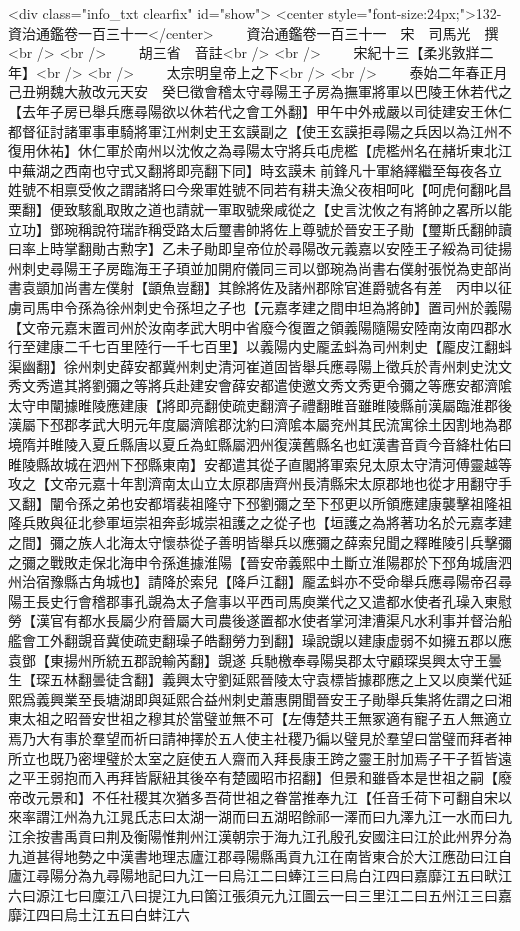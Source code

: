 <div class="info_txt clearfix" id="show">
<center style="font-size:24px;">132-資治通鑑卷一百三十一</center>
  　　資治通鑑卷一百三十一　宋　司馬光　撰<br />
<br />
　　胡三省　音註<br />
<br />
　　宋紀十三【柔兆敦牂二年】<br />
<br />
　　太宗明皇帝上之下<br />
<br />
　　泰始二年春正月己丑朔魏大赦改元天安　癸巳徵會稽太守尋陽王子房為撫軍將軍以巴陵王休若代之【去年子房已舉兵應尋陽欲以休若代之會工外翻】甲午中外戒嚴以司徒建安王休仁都督征討諸軍事車騎將軍江州刺史王玄謨副之【使王玄謨拒尋陽之兵因以為江州不復用休祐】休仁軍於南州以沈攸之為尋陽太守將兵屯虎檻【虎檻州名在赭圻東北江中蕪湖之西南也守式又翻將即亮翻下同】時玄謨未前鋒凡十軍絡繹繼至每夜各立姓號不相禀受攸之謂諸將曰今衆軍姓號不同若有耕夫漁父夜相呵叱【呵虎何翻叱昌栗翻】便致駭亂取敗之道也請就一軍取號衆咸從之【史言沈攸之有將帥之畧所以能立功】鄧琬稱說符瑞詐稱受路太后璽書帥將佐上尊號於晉安王子勛【璽斯氏翻帥讀曰率上時掌翻勛古勲字】乙未子勛即皇帝位於尋陽改元義嘉以安陸王子綏為司徒揚州刺史尋陽王子房臨海王子頊並加開府儀同三司以鄧琬為尚書右僕射張悦為吏部尚書袁顗加尚書左僕射【顗魚豈翻】其餘將佐及諸州郡除官進爵號各有差　丙申以征虜司馬申令孫為徐州刺史令孫坦之子也【元嘉孝建之間申坦為將帥】置司州於義陽【文帝元嘉末置司州於汝南孝武大明中省廢今復置之領義陽隨陽安陸南汝南四郡水行至建康二千七百里陸行一千七百里】以義陽内史龎孟蚪為司州刺史【龎皮江翻蚪渠幽翻】徐州刺史薛安都冀州刺史清河崔道固皆舉兵應尋陽上徵兵於青州刺史沈文秀文秀遣其將劉彌之等將兵赴建安會薛安都遣使邀文秀文秀更令彌之等應安都濟隂太守申闡據睢陵應建康【將即亮翻使疏吏翻濟子禮翻睢音雖睢陵縣前漢屬臨淮郡後漢屬下邳郡孝武大明元年度屬濟隂郡沈約曰濟隂本屬兖州其民流寓徐土因割地為郡境隋并睢陵入夏丘縣唐以夏丘為虹縣屬泗州復漢舊縣名也虹漢書音貢今音絳杜佑曰睢陵縣故城在泗州下邳縣東南】安都遣其從子直閣將軍索兒太原太守清河傅靈越等攻之【文帝元嘉十年割濟南太山立太原郡唐齊州長清縣宋太原郡地也從才用翻守手又翻】闡令孫之弟也安都壻裴祖隆守下邳劉彌之至下邳更以所領應建康襲擊祖隆祖隆兵敗與征北參軍垣崇祖奔彭城崇祖護之之從子也【垣護之為將著功名於元嘉孝建之間】彌之族人北海太守懷恭從子善明皆舉兵以應彌之薛索兒聞之釋睢陵引兵擊彌之彌之戰敗走保北海申令孫進據淮陽【晉安帝義熙中土斷立淮陽郡於下邳角城唐泗州治宿豫縣古角城也】請降於索兒【降戶江翻】龎孟蚪亦不受命舉兵應尋陽帝召尋陽王長史行會稽郡事孔覬為太子詹事以平西司馬庾業代之又遣都水使者孔璪入東慰勞【漢官有都水長屬少府晉屬大司農後遂置都水使者掌河津漕渠凡水利事并督治船艦會工外翻覬音冀使疏吏翻璪子皓翻勞力到翻】璪說覬以建康虚弱不如擁五郡以應袁鄧【東揚州所統五郡說輸芮翻】覬遂兵馳檄奉尋陽吳郡太守顧琛吳興太守王曇生【琛五林翻曇徒含翻】義興太守劉延熙晉陵太守袁標皆據郡應之上又以庾業代延熙爲義興業至長塘湖即與延熙合益州刺史蕭惠開聞晉安王子勛舉兵集將佐謂之曰湘東太祖之昭晉安世祖之穆其於當璧並無不可【左傳楚共王無冢適有寵子五人無適立焉乃大有事於羣望而祈曰請神擇於五人使主社稷乃徧以璧見於羣望曰當璧而拜者神所立也既乃密埋璧於太室之庭使五人齋而入拜長康王跨之靈王肘加焉子干子晢皆遠之平王弱抱而入再拜皆厭紐其後卒有楚國昭市招翻】但景和雖昏本是世祖之嗣【廢帝改元景和】不任社稷其次猶多吾荷世祖之眷當推奉九江【任音壬荷下可翻自宋以來率謂江州為九江晁氏志曰太湖一湖而曰五湖昭餘祁一澤而曰九澤九江一水而曰九江余按書禹貢曰荆及衡陽惟荆州江漢朝宗于海九江孔殷孔安國注曰江於此州界分為九道甚得地勢之中漢書地理志廬江郡尋陽縣禹貢九江在南皆東合於大江應劭曰江自廬江尋陽分為九尋陽地記曰九江一曰烏江二曰蜯江三曰烏白江四曰嘉靡江五曰畎江六曰源江七曰廩江八曰提江九曰箘江張須元九江圖云一曰三里江二曰五州江三曰嘉靡江四曰烏土江五曰白蚌江六